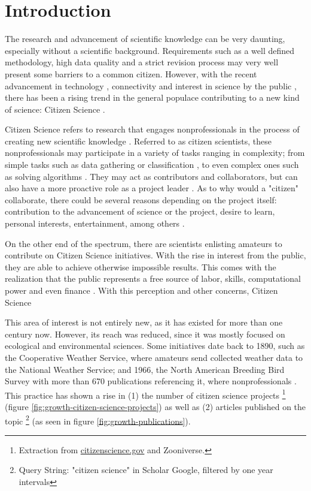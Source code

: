 \chapter*[Introduction]{Introduction}

The research and advancement of scientific knowledge can be very daunting, especially without a scientific background. Requirements such as a well defined methodology, high data quality and a strict revision process may very well present some barriers to a common citizen. However, with the recent advancement in technology \cite{newman2012future}, connectivity \cite{newman2012future} and interest in science by the public \cite{silvertown2009new}, there has been a rising trend in the general populace contributing to a new kind of science: Citizen Science \cite{mckinley2017citizen}.

Citizen Science refers to research that engages nonprofessionals in the process of creating new scientific knowledge \cite{bonney2014next}. Referred to as citizen scientists, these nonprofessionals may participate in a variety of tasks ranging in complexity; from simple tasks such as data gathering or classification \cite{barker2013pascal}, to even complex ones such as solving algorithms \cite{cooper2010predicting}. They may act as contributors and collaborators, but can also have a more proactive role as a project leader \cite{robinson2018ten}. As to why would a "citizen" collaborate, there could be several reasons depending on the project itself: contribution to the advancement of science or the project, desire to learn, personal interests, entertainment, among others \cite{tinati2016because}. 

On the other end of the spectrum, there are scientists enlisting amateurs to contribute on Citizen Science initiatives. With the rise in interest from the public, they are able to achieve otherwise impossible results. %
This comes with the realization that the public represents a free source of labor, skills, computational power and even finance \cite{silvertown2009new}. With this perception and other concerns, Citizen Science 


This area of interest is not entirely new, as it has existed for more than one century now. However, its reach was reduced, since it was mostly focused on ecological and environmental sciences. Some initiatives date back to 1890, such as the Cooperative Weather Service, where amateurs send collected weather data to the National Weather Service; and 1966, the North American Breeding Bird Survey with more than 670 publications referencing it, where nonprofessionals   . This practice has shown a rise in (1) the number of citizen science projects \footnote{Extraction from \href{citizenscience.gov}{citizenscience.gov} and Zooniverse.} (figure \ref{fig:growth-citizen-science-projects}) as well as (2) articles published on the topic \footnote{Query String: "citizen science" in Scholar Google, filtered by one year intervals} (as seen in figure \ref{fig:growth-publications}).

